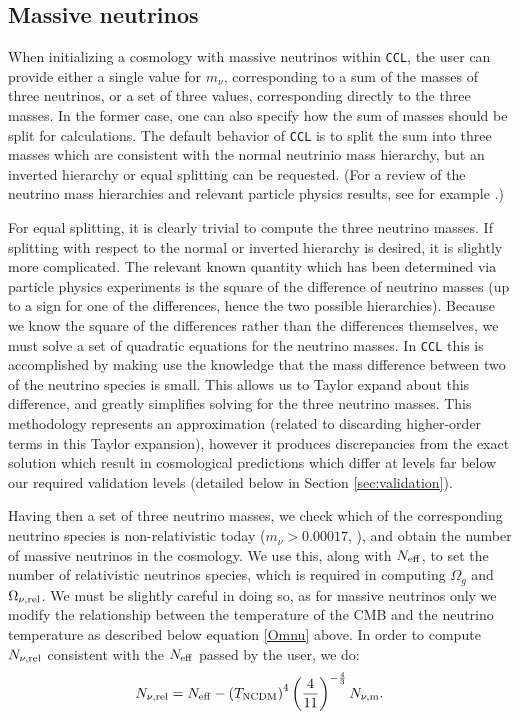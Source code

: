 \documentclass[\docopts]{\docclass}
\newcommand{\ccl}{{\tt CCL}\xspace}
\begin{document}
\subsection{Massive neutrinos}

When initializing a cosmology with massive neutrinos within \ccl , the user can provide either a single value for $m_\nu$, corresponding to a sum of the masses of three neutrinos, or a set of three values, corresponding directly to the three masses. In the former case, one can also specify how the sum of masses should be split for calculations. The default behavior of \ccl is to split the sum into three masses which are consistent with the normal neutrinio mass hierarchy, but an inverted hierarchy or equal splitting can be requested. (For a review of the neutrino mass hierarchies and relevant particle physics results, see for example \cite{Gerbino2017, Lesgourgues2012}.)

For equal splitting, it is clearly trivial to compute the three neutrino masses. If splitting with respect to the normal or inverted hierarchy is desired, it is slightly more complicated. The relevant known quantity which has been determined via particle physics experiments is the square of the difference of neutrino masses (up to a sign for one of the differences, hence the two possible hierarchies). Because we know the square of the differences rather than the differences themselves, we must solve a set of quadratic equations for the neutrino masses. In \ccl this is accomplished by making use the knowledge that the mass difference between two of the neutrino species is small. This allows us to Taylor expand about this difference, and greatly simplifies solving for the three neutrino masses. This methodology represents an approximation (related to discarding higher-order terms in this Taylor expansion), however it produces discrepancies from the exact solution which result in cosmological predictions which differ at levels far below our required validation levels (detailed below in Section \ref{sec:validation}).

Having then a set of three neutrino masses, we check which of the corresponding neutrino species is non-relativistic today ($m_\nu>0.00017$, \citealt{Lesgourgues2012}), and obtain the number of massive neutrinos in the cosmology. We use this, along with $N_{\rm eff}$, to set the number of relativistic neutrinos species, which is required in computing $\Omega_g$ and $\Omega_{\nu, {\rm rel}}$. We must be slightly careful in doing so, as for massive neutrinos only we modify the relationship between the temperature of the CMB and the neutrino temperature as described below equation \ref{Omnu} above. In order to compute $N_{\nu, {\rm rel}}$  consistent with the $N_{\rm eff}$ passed by the user, we do:
\begin{equation}
N_{\nu, {\rm rel}} = N_{\rm eff} - \left(T_{\rm NCDM}\right)^{4} \left(\frac{4}{11}\right)^{-\frac{4}{3}} N_{\nu, {\rm m}}.
\label{Nnurel}
\end{equation}
\end{document}
